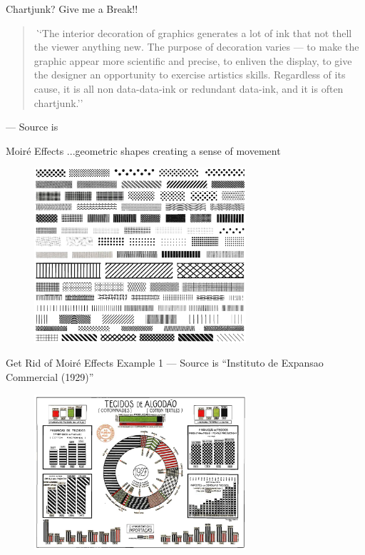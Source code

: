 \documentclass[aspectratio=1610]{beamer}
\begin{document}
\begin{frame}{Chartjunk? Give me a Break!!}{}
	\begin{quote}
		\textit
		``The interior decoration of graphics generates a lot of ink that not thell the
		viewer anything new. The purpose of decoration varies — to make the graphic
		appear more scientific and precise, to enliven the display, to give the designer
		an opportunity to exercise artistics skills. Regardless of its cause, it is all
		non data-data-ink or redundant data-ink, and it is often chartjunk.''
	\end{quote}

	\raggedleft --- Source is \cite[][page 107]{tufte2001}
\end{frame}

\begin{frame}
	{Moir\'e Effects}
	{...geometric shapes creating a sense of movement}
	\begin{figure}
		\begin{center}
			\includegraphics[width=0.7\textwidth]
			{images/moire_effects.png}
		\end{center}
	\end{figure}
\end{frame}

\begin{frame}
	{Get Rid of Moir\'e Effects}
	{Example 1 --- Source is ``Instituto de Expansao Commercial (1929)''}
	\centering
	\begin{figure}
		\includegraphics[width=0.7\textwidth]{images/moire_effect_1.png}
	\end{figure}
\end{frame}
\end{document}
